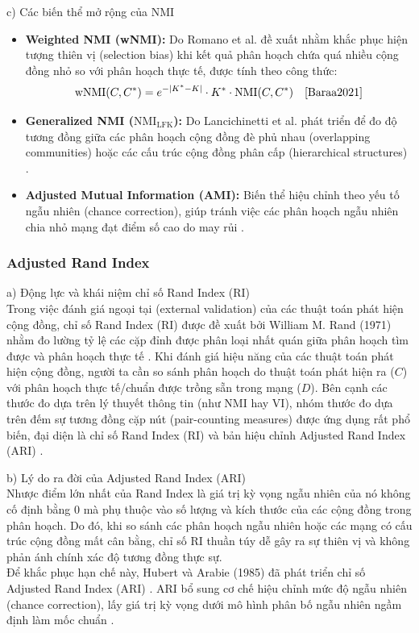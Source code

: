 \documentclass[14pt,a4paper]{extarticle}
\begin{document}
\noindent c) Các biến thể mở rộng của NMI
\begin{itemize}
    \item \textbf{Weighted NMI (wNMI):} Do Romano et al. đề xuất nhằm khắc phục hiện tượng thiên vị (selection bias) khi kết quả phân hoạch chứa quá nhiều cộng đồng nhỏ so với phân hoạch thực tế, được tính theo công thức:
    \[
    \text{wNMI}(C, C^*) = e^{-|K^* - K|} \cdot K^* \cdot \text{NMI}(C, C^*) \quad \text{\cite{Baraa2021}}
    \]
    \item \textbf{Generalized NMI ($\text{NMI}_{\text{LFK}}$):} Do Lancichinetti et al. phát triển để đo độ tương đồng giữa các phân hoạch cộng đồng đè phủ nhau (overlapping communities) hoặc các cấu trúc cộng đồng phân cấp (hierarchical structures) \cite{Fortunato2010}.
    \item \textbf{Adjusted Mutual Information (AMI):} Biến thể hiệu chỉnh theo yếu tố ngẫu nhiên (chance correction), giúp tránh việc các phân hoạch ngẫu nhiên chia nhỏ mạng đạt điểm số cao do may rủi \cite{Dao2020}.
\end{itemize}

\subsubsection{Adjusted Rand Index}

\noindent a) Động lực và khái niệm chỉ số Rand Index (RI)
\\
Trong việc đánh giá ngoại tại (external validation) của các thuật toán phát hiện cộng đồng, chỉ số Rand Index (RI) được đề xuất bởi William M. Rand (1971) nhằm đo lường tỷ lệ các cặp đỉnh được phân loại nhất quán giữa phân hoạch tìm được và phân hoạch thực tế \cite{Beldi2025, Dao2020}. Khi đánh giá hiệu năng của các thuật toán phát hiện cộng đồng, người ta cần so sánh phân hoạch do thuật toán phát hiện ra ($C$) với phân hoạch thực tế/chuẩn được trồng sẵn trong mạng ($D$). Bên cạnh các thước đo dựa trên lý thuyết thông tin (như NMI hay VI), nhóm thước đo dựa trên đếm sự tương đồng cặp nút (pair-counting measures) được ứng dụng rất phổ biến, đại diện là chỉ số Rand Index (RI) và bản hiệu chỉnh Adjusted Rand Index (ARI) \cite{Traag2014}.

\noindent b) Lý do ra đời của Adjusted Rand Index (ARI)
\\
Nhược điểm lớn nhất của Rand Index là giá trị kỳ vọng ngẫu nhiên của nó không cố định bằng $0$ mà phụ thuộc vào số lượng và kích thước của các cộng đồng trong phân hoạch. Do đó, khi so sánh các phân hoạch ngẫu nhiên hoặc các mạng có cấu trúc cộng đồng mất cân bằng, chỉ số RI thuần túy dễ gây ra sự thiên vị và không phản ánh chính xác độ tương đồng thực sự.
\\
Để khắc phục hạn chế này, Hubert và Arabie (1985) đã phát triển chỉ số Adjusted Rand Index (ARI) \cite{Beldi2025, Dao2020}. ARI bổ sung cơ chế hiệu chỉnh mức độ ngẫu nhiên (chance correction), lấy giá trị kỳ vọng dưới mô hình phân bố ngẫu nhiên ngầm định làm mốc chuẩn \cite{Dao2020}.
\end{document}
